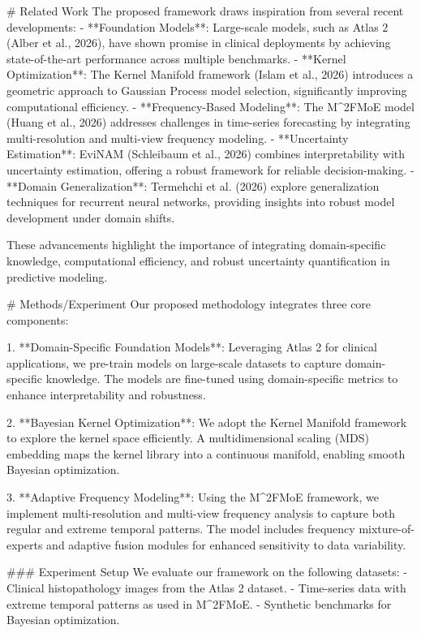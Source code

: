 # Related Work  
The proposed framework draws inspiration from several recent developments:
- **Foundation Models**: Large-scale models, such as Atlas 2 (Alber et al., 2026), have shown promise in clinical deployments by achieving state-of-the-art performance across multiple benchmarks.
- **Kernel Optimization**: The Kernel Manifold framework (Islam et al., 2026) introduces a geometric approach to Gaussian Process model selection, significantly improving computational efficiency.
- **Frequency-Based Modeling**: The M^2FMoE model (Huang et al., 2026) addresses challenges in time-series forecasting by integrating multi-resolution and multi-view frequency modeling.
- **Uncertainty Estimation**: EviNAM (Schleibaum et al., 2026) combines interpretability with uncertainty estimation, offering a robust framework for reliable decision-making.
- **Domain Generalization**: Termehchi et al. (2026) explore generalization techniques for recurrent neural networks, providing insights into robust model development under domain shifts.

These advancements highlight the importance of integrating domain-specific knowledge, computational efficiency, and robust uncertainty quantification in predictive modeling.

# Methods/Experiment  
Our proposed methodology integrates three core components:

1. **Domain-Specific Foundation Models**: Leveraging Atlas 2 for clinical applications, we pre-train models on large-scale datasets to capture domain-specific knowledge. The models are fine-tuned using domain-specific metrics to enhance interpretability and robustness.

2. **Bayesian Kernel Optimization**: We adopt the Kernel Manifold framework to explore the kernel space efficiently. A multidimensional scaling (MDS) embedding maps the kernel library into a continuous manifold, enabling smooth Bayesian optimization.

3. **Adaptive Frequency Modeling**: Using the M^2FMoE framework, we implement multi-resolution and multi-view frequency analysis to capture both regular and extreme temporal patterns. The model includes frequency mixture-of-experts and adaptive fusion modules for enhanced sensitivity to data variability.

### Experiment Setup  
We evaluate our framework on the following datasets:
- Clinical histopathology images from the Atlas 2 dataset.
- Time-series data with extreme temporal patterns as used in M^2FMoE.
- Synthetic benchmarks for Bayesian optimization.

